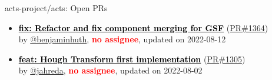 \begin{frame}[allowframebreaks]{ acts-project/acts: Open PRs
}
\begin{itemize}
    \item\propen
    \hspace*{0.1em}
    \textbf{\href{https://github.com/acts-project/acts/pull/1364}{\textcolor{black}{fix: Refactor and fix component merging for GSF}}}
    (\href{https://github.com/acts-project/acts/pull/1364}{PR\#1364}) \\
    by \href{https://github.com/benjaminhuth}{@benjaminhuth}, {}\textbf{\textcolor{Red}{no assignee}}, updated on 2022-08-12

    \item\propen
    \hspace*{0.1em}
    \textbf{\href{https://github.com/acts-project/acts/pull/1305}{\textcolor{black}{feat: Hough Transform first implementation}}}
    (\href{https://github.com/acts-project/acts/pull/1305}{PR\#1305}) \\
    by \href{https://github.com/jahreda}{@jahreda}, {}\textbf{\textcolor{Red}{no assignee}}, updated on 2022-08-02

    
  \end{itemize}

\end{frame}







